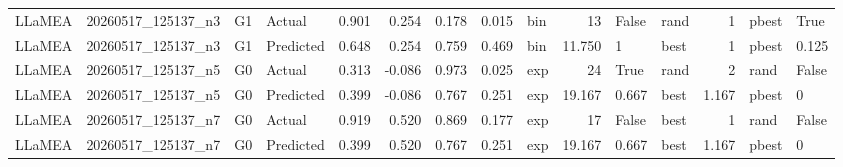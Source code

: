 \begin{table}[htbp]
{\begin{tabular}{lll l rr rr l r l l r l l}
LLaMEA & 20260517\_125137\_n3 & G1 & Actual & 0.901 & 0.254 & 0.178 & 0.015 & bin & 13 & False & rand & 1 & pbest & True \\
LLaMEA & 20260517\_125137\_n3 & G1 & Predicted & 0.648 & 0.254 & 0.759 & 0.469 & bin & 11.750 & 1 & best & 1 & pbest & 0.125 \\
LLaMEA & 20260517\_125137\_n5 & G0 & Actual & 0.313 & -0.086 & 0.973 & 0.025 & exp & 24 & True & rand & 2 & rand & False \\
LLaMEA & 20260517\_125137\_n5 & G0 & Predicted & 0.399 & -0.086 & 0.767 & 0.251 & exp & 19.167 & 0.667 & best & 1.167 & pbest & 0 \\
LLaMEA & 20260517\_125137\_n7 & G0 & Actual & 0.919 & 0.520 & 0.869 & 0.177 & exp & 17 & False & best & 1 & rand & False \\
LLaMEA & 20260517\_125137\_n7 & G0 & Predicted & 0.399 & 0.520 & 0.767 & 0.251 & exp & 19.167 & 0.667 & best & 1.167 & pbest & 0 \\
\bottomrule
\end{tabular}%
}
\end{table}
